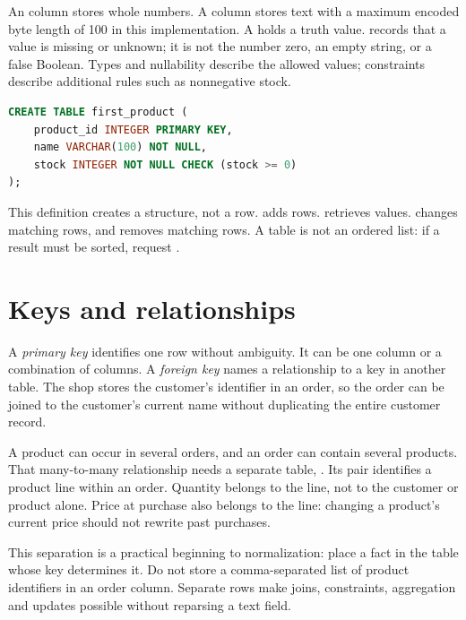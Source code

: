 An  column stores whole numbers. A  column
stores text with a maximum encoded byte length of 100 in this implementation.
A  holds a truth value.  records that a value is
missing or unknown; it is not the number zero, an empty string, or a false
Boolean. Types and nullability describe the allowed values; constraints
describe additional rules such as nonnegative stock.

\begin{lstlisting}[language=SQL]
CREATE TABLE first_product (
    product_id INTEGER PRIMARY KEY,
    name VARCHAR(100) NOT NULL,
    stock INTEGER NOT NULL CHECK (stock >= 0)
);
\end{lstlisting}

This definition creates a structure, not a row.  adds rows.
 retrieves values.  changes matching rows, and
 removes matching rows. A table is not an ordered list: if a
result must be sorted, request .

\section{Keys and relationships}
A \emph{primary key} identifies one row without ambiguity. It can be one
column or a combination of columns. A \emph{foreign key} names a relationship
to a key in another table. The shop stores the customer's identifier in an
order, so the order can be joined to the customer's current name without
duplicating the entire customer record.

A product can occur in several orders, and an order can contain several
products. That many-to-many relationship needs a separate table,
. Its pair  identifies a
product line within an order. Quantity belongs to the line, not to the
customer or product alone. Price at purchase also belongs to the line:
changing a product's current price should not rewrite past purchases.

This separation is a practical beginning to normalization: place a fact in
the table whose key determines it. Do not store a comma-separated list of
product identifiers in an order column. Separate rows make joins,
constraints, aggregation and updates possible without reparsing a text field.


